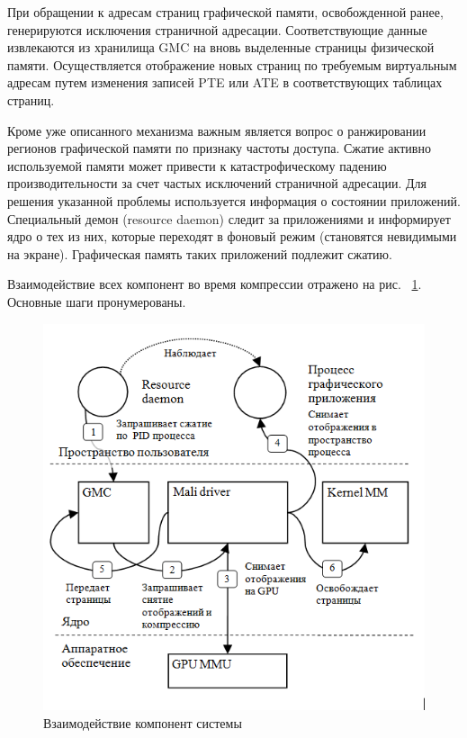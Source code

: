 \documentclass[10pt, a5paper]{article}
\begin{document}
При обращении к адресам страниц графической памяти, освобожденной ранее, генерируются исключения страничной адресации.  Соответствующие данные извлекаются из хранилища GMC на вновь выделенные страницы физической памяти. Осуществляется отображение новых страниц по требуемым виртуальным адресам путем изменения записей PTE или ATE в соответствующих таблицах страниц.

Кроме уже описанного механизма важным является вопрос о ранжировании регионов графической памяти по признаку частоты доступа. Сжатие активно используемой памяти может привести к катастрофическому падению производительности за счет частых исключений страничной адресации. Для решения указанной проблемы используется информация о состоянии приложений. Специальный демон (resource daemon) следит за приложениями и информирует ядро о тех из них, которые переходят в фоновый режим (становятся невидимыми на экране). Графическая память таких приложений подлежит сжатию.

Взаимодействие всех компонент во время компрессии отражено на рис. ~\ref{Rogachev2}. Основные шаги пронумерованы.

\begin{figure}[h!]
  \centering
  \includegraphics[]{18_2016_Rogachev2.png}
  \caption{Взаимодействие компонент системы}
  \label{Rogachev2}
  
\end{figure}
\end{document}

